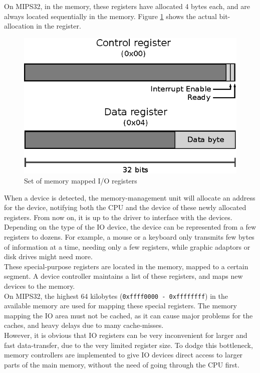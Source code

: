 On MIPS32, in the memory, these registers have allocated 4 bytes each, and are
always located sequentially in the memory. Figure \ref{fig:io_registers} shows
the actual bit-allocation in the register.
\begin{figure}[H]
	\centering
	\includegraphics[scale=1]{io/io_registers.eps}
	\caption{Set of memory mapped I/O registers\cite{imgtec:pra}}
	\label{fig:io_registers}
\end{figure}

When a device is detected, the memory-management unit will allocate an address
for the device, notifying both the CPU and the device of these newly allocated registers.
From now on, it is up to the driver to interface with the devices.\\
Depending on the type of the IO device, the device can be represented from a
few registers to dozens. For example, a mouse or a keyboard only transmits few
bytes of information at a time, needing only a few registers, while graphic
adaptors or disk drives might need more\cite{cs_uwm:memory_mapped_io}.\\
These special-purpose registers are located in the memory, mapped to a certain
segment. A device controller maintains a list of these registers, and maps new
devices to the memory.\cite{britton:mips}\\
On MIPS32, the highest 64 kilobytes (\texttt{0xffff0000 - 0xffffffff}) in the
available memory are used for mapping these special registers\cite{cs_uwm:memory_mapped_io}.
The memory mapping the IO area must not be cached, as it can cause major problems
for the caches, and heavy delays due to many cache-misses\cite{see_mips_run}.\\
However, it is obvious that IO registers can be very inconvenient for larger and
fast data-transfer, due to the very limited register size. To dodge this
bottleneck, memory controllers are implemented to give IO devices direct access
to larger parts of the main memory, without the need of going through the CPU first.

